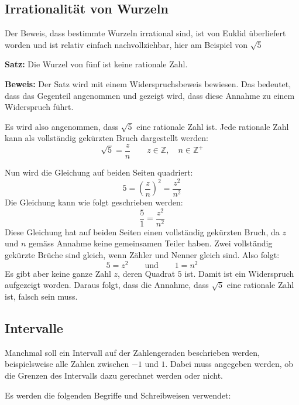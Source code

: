 \newpage
\subsection{Irrationalität von Wurzeln}

Der Beweis, dass bestimmte Wurzeln irrational sind, ist von Euklid überliefert worden und ist relativ einfach nachvollziehbar, hier am Beispiel von $\sqrt{5}$

\begin{theorem}
  \textbf{Satz:} Die Wurzel von fünf ist keine rationale Zahl.
\end{theorem}

\textbf{Beweis:} Der Satz wird mit einem Widerspruchsbeweis bewiesen. Das bedeutet, dass das Gegenteil angenommen und gezeigt wird, dass diese Annahme zu einem Widerspruch führt.

Es wird also angenommen, dass $\sqrt{5}$ eine rationale Zahl ist. Jede rationale Zahl kann als vollständig gekürzten Bruch dargestellt werden:
\[
  \sqrt{5} = \frac{z}{n} \qquad z \in \mathbb{Z}, \quad n \in \mathbb{Z^{+}}
\]

Nun wird die Gleichung auf beiden Seiten quadriert:
\[
  5 = \left(\frac{z}{n}\right)^{2} = \frac{z^{2}}{n^{2}}
\]
Die Gleichung kann wie folgt geschrieben werden:
\[
  \frac{5}{1} = \frac{z^{2}}{n^{2}}
\]
Diese Gleichung hat auf beiden Seiten einen vollständig gekürzten Bruch, da $z$ und $n$ gemäss Annahme keine gemeinsamen Teiler haben. Zwei vollständig gekürzte Brüche sind gleich, wenn Zähler und Nenner gleich sind. Also folgt:
\[
  5 = z^{2} \qquad\text{und}\qquad 1 = n^{2}
\]
Es gibt aber keine ganze Zahl $z$, deren Quadrat $5$ ist. Damit ist ein Widerspruch aufgezeigt worden. Daraus folgt, dass die Annahme, dass $\sqrt{5}$ eine rationale Zahl ist, falsch sein muss.

\subsection{Intervalle}

Manchmal soll ein Intervall auf der Zahlengeraden beschrieben werden, beispielsweise alle Zahlen zwischen $-1$ und $1$. Dabei muss angegeben werden, ob die Grenzen des Intervalls dazu gerechnet werden oder nicht.

Es werden die folgenden Begriffe und Schreibweisen verwendet:

